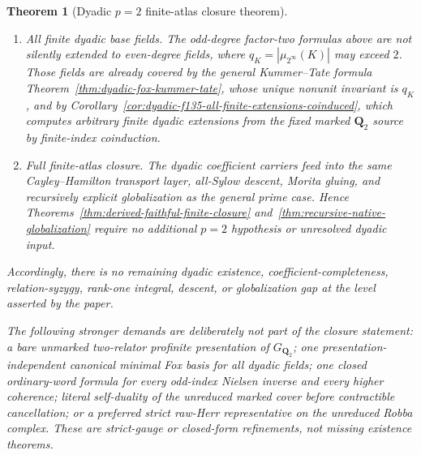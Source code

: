 \documentclass[11pt]{article}
\newtheorem{theorem}{Theorem}[section]
\theoremstyle{definition}
\begin{document}
\begin{theorem}[Dyadic $p=2$ finite-atlas closure theorem]
\begin{enumerate}[label=\textnormal{(\roman*)}]
\item \emph{All finite dyadic base fields.}
The odd-degree factor-two formulas above are not
silently extended to even-degree fields, where
$q_K=|\mu_{2^\infty}(K)|$ may exceed $2$.
Those fields are already covered by the general
Kummer--Tate formula
Theorem~\ref{thm:dyadic-fox-kummer-tate}, whose unique
nonunit invariant is $q_K$, and by
Corollary~\ref{cor:dyadic-f135-all-finite-extensions-coinduced},
which computes arbitrary finite dyadic extensions from
the fixed marked $\mathbf Q_2$ source by finite-index
coinduction.

\item \emph{Full finite-atlas closure.}
The dyadic coefficient carriers feed into the same
Cayley--Hamilton transport layer, all-Sylow descent,
Morita gluing, and recursively explicit globalization
as the general prime case.  Hence
Theorems~\ref{thm:derived-faithful-finite-closure}
and~\ref{thm:recursive-native-globalization}
require no additional $p=2$ hypothesis or unresolved
dyadic input.
\end{enumerate}

Accordingly, there is no remaining \emph{dyadic
existence, coefficient-completeness, relation-syzygy,
rank-one integral, descent, or globalization gap} at
the level asserted by the paper.

The following stronger demands are deliberately
\emph{not} part of the closure statement:
a bare unmarked two-relator profinite presentation of
$G_{\mathbf Q_2}$; one presentation-independent
canonical minimal Fox basis for all dyadic fields;
one closed ordinary-word formula for every odd-index
Nielsen inverse and every higher coherence; literal
self-duality of the unreduced marked cover before
contractible cancellation; or a preferred strict
raw-Herr representative on the unreduced Robba
complex.  These are strict-gauge or closed-form
refinements, not missing existence theorems.
\end{theorem}
\end{document}
